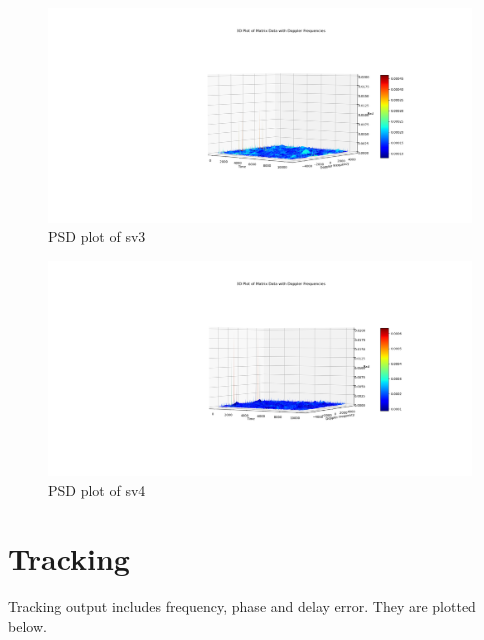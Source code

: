 \begin{normalsize}
\begin{figure}[ht]
\centering
\includegraphics[width=1\textwidth]{figs/sv3_acq.png}
\centering
\captionsetup{justification=centering}
\caption{PSD plot of sv3}
\end{figure}
\end{normalsize}

\begin{normalsize}
\begin{figure}[ht]
\centering
\includegraphics[width=1\textwidth]{figs/sv4_acq.png}
\centering
\captionsetup{justification=centering}
\caption{PSD plot of sv4}
\end{figure}
\end{normalsize}
\section{Tracking}
Tracking output includes frequency, phase and delay error. They are plotted below.

